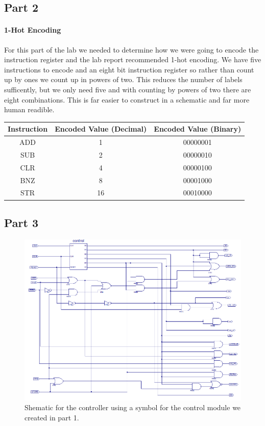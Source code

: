 \documentclass[12pt]{article}
\begin{document}
	\subsection{Part 2}
		\paragraph*{1-Hot Encoding}
			For this part of the lab we needed to determine how we were going to encode the instruction register and the lab report recommended 1-hot encoding. We have five instructions to encode and an eight bit instruction register so rather than count up by ones we count up in powers of two. This reduces the number of labels sufficently, but we only need five and with counting by powers of two there are eight combinations. This is far easier to construct in a schematic and far more human readible.\\

			\begin{tabular}{c c c}
			\textbf{Instruction} & \textbf{Encoded Value (Decimal)} & \textbf{Encoded Value (Binary)}\\
			\hline
			ADD & 1  & 00000001\\
			SUB & 2  & 00000010\\
			CLR & 4  & 00000100\\
			BNZ & 8  & 00001000\\
			STR & 16 & 00010000\\
			\end{tabular}
		
		\newpage
	\subsection{Part 3}
		
		\begin{figure}[h]
			\includegraphics[scale=.6]{controller_sch.png}
			\caption{Shematic for the controller using a symbol for the control module we created in part 1.}
		\end{figure}
		
\end{document}

